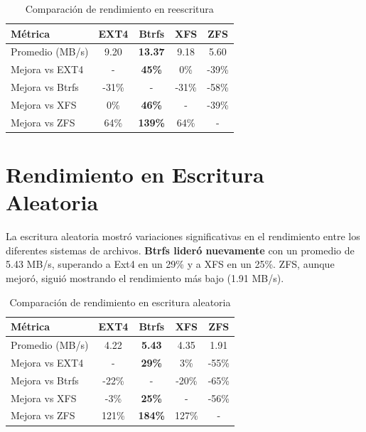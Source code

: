\begin{table}[h!]
\centering
\caption{Comparación de rendimiento en reescritura}
\begin{tabular}{|l|c|c|c|c|}
\hline
\textbf{Métrica} & \textbf{EXT4} & \textbf{Btrfs} & \textbf{XFS} & \textbf{ZFS} \\ \hline
Promedio (MB/s)   & 9.20          & \textbf{13.37} & 9.18         & 5.60         \\ \hline
Mejora vs EXT4    & -             & \textbf{45\%}  & 0\%          & -39\%        \\ \hline
Mejora vs Btrfs   & -31\%         & -              & -31\%        & -58\%        \\ \hline
Mejora vs XFS     & 0\%           & \textbf{46\%}  & -            & -39\%        \\ \hline
Mejora vs ZFS     & 64\%          & \textbf{139\%} & 64\%         & -            \\ \hline
\end{tabular}
\end{table}

\section{Rendimiento en Escritura Aleatoria}

La escritura aleatoria mostró variaciones significativas en el rendimiento entre los diferentes sistemas de archivos. \textbf{Btrfs lideró nuevamente} con un promedio de 5.43 MB/s, superando a Ext4 en un 29\% y a XFS en un 25\%. ZFS, aunque mejoró, siguió mostrando el rendimiento más bajo (1.91 MB/s).

\begin{table}[h!]
\centering
\caption{Comparación de rendimiento en escritura aleatoria}
\begin{tabular}{|l|c|c|c|c|}
\hline
\textbf{Métrica} & \textbf{EXT4} & \textbf{Btrfs} & \textbf{XFS} & \textbf{ZFS} \\ \hline
Promedio (MB/s)   & 4.22          & \textbf{5.43}  & 4.35         & 1.91         \\ \hline
Mejora vs EXT4    & -             & \textbf{29\%}  & 3\%          & -55\%        \\ \hline
Mejora vs Btrfs   & -22\%         & -              & -20\%        & -65\%        \\ \hline
Mejora vs XFS     & -3\%          & \textbf{25\%}  & -            & -56\%        \\ \hline
Mejora vs ZFS     & 121\%         & \textbf{184\%} & 127\%        & -            \\ \hline
\end{tabular}
\end{table}

